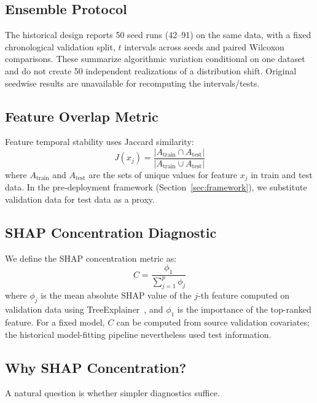 \documentclass[accepted]{uai2026} %
\begin{document}
\subsection{Ensemble Protocol}

The historical design reports 50 seed runs (42--91) on the same data, with a fixed chronological validation split, $t$ intervals across seeds and paired Wilcoxon comparisons. These summarize algorithmic variation conditional on one dataset and do not create 50 independent realizations of a distribution shift. Original seedwise results are unavailable for recomputing the intervals/tests.

\subsection{Feature Overlap Metric}

Feature temporal stability uses Jaccard similarity:
\begin{equation}\label{eq:jaccard}
J(x_j) = \frac{|A_{\text{train}} \cap A_{\text{test}}|}{|A_{\text{train}} \cup A_{\text{test}}|}
\end{equation}
where $A_{\text{train}}$ and $A_{\text{test}}$ are the sets of unique values for feature $x_j$ in train and test data. In the pre-deployment framework (Section~\ref{sec:framework}), we substitute validation data for test data as a proxy.

\subsection{SHAP Concentration Diagnostic}\label{sec:shap_method}

We define the SHAP concentration metric as:
\begin{equation}\label{eq:concentration}
C = \frac{\phi_1}{\sum_{j=1}^{p} \phi_j}
\end{equation}
where $\phi_j$ is the mean absolute SHAP value of the $j$-th feature computed on validation data using TreeExplainer~\citep{lundberg2020local}, and $\phi_1$ is the importance of the top-ranked feature. For a fixed model, $C$ can be computed from source validation covariates; the historical model-fitting pipeline nevertheless used test information.

\subsection{Why SHAP Concentration?}\label{sec:why_shap}

A natural question is whether simpler diagnostics suffice.
\end{document}
